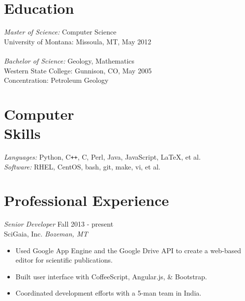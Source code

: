\documentclass[line,margin]{res}
\begin{document}
\address{\texttt{perry@rphv.net} | 317.695.9860  }
\address{323 S. Bozeman Ave, Bozeman, MT 59715}
 
\begin{resume}
 
\section{\sc Education} 
        {\sl Master of Science:} Computer Science\\
        University of Montana: Missoula, MT, May 2012\\
        \\
        {\sl Bachelor of Science:} Geology, Mathematics \\
        Western State College: Gunnison, CO, May 2005 \\
        Concentration: Petroleum Geology
 
\section{\sc Computer \\ Skills}    
        {\sl Languages:} Python, C\verb!++!, C, Perl, Java, JavaScript, \LaTeX, et al.\\
        {\sl Software:} RHEL, CentOS, bash, git, make, vi, et al.\\

\section{\sc Professional Experience} 

        {\sl Senior Developer} \hfill  Fall 2013 - present\\
        SciGaia, Inc. \hfill {\sl Bozeman, MT}
        \begin{itemize} \itemsep -2pt
            \item Used Google App Engine and the Google Drive API to create a web-based editor for scientific publications.
            \item Built user interface with CoffeeScript, Angular.js, \& Bootstrap.
            \item Coordinated development efforts with a 5-man team in India.
        \end{itemize}


\end{resume}
\end{document}
